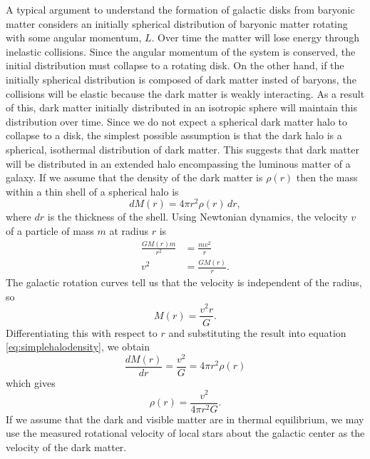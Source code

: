 A typical argument to understand the formation of galactic disks from baryonic
matter considers an initially spherical distribution of baryonic matter
rotating with some angular momentum, $L$. Over time the matter will lose
energy through inelastic collisions. Since the angular momentum of the system
is conserved, the initial distribution must collapse to a rotating disk.  On
the other hand, if the initially spherical distribution is composed of dark
matter insted of baryons, the collisions will be elastic because the dark
matter is weakly interacting. As a result of this, dark matter initially
distributed in an isotropic sphere will maintain this distribution over time.
Since we do not expect a spherical dark matter halo to collapse to a disk, the
simplest possible assumption is that the dark halo is a spherical, isothermal
distribution of dark matter. This suggests that dark matter will be
distributed in an extended halo encompassing the luminous matter of a galaxy.
If we assume that the density of the dark matter
is $\rho(r)$ then the mass within a thin shell of a spherical halo is
\begin{equation}
dM(r) = 4\pi r^2 \rho(r)\, dr,
\label{eq:simplehalodensity}
\end{equation}
where $dr$ is the thickness of the shell.
Using Newtonian dynamics, the velocity $v$ of a particle of mass $m$ at
radius $r$ is
\begin{equation}
\begin{split}
\frac{GM(r)m}{r^2} &= \frac{mv^2}{r} \\
v^2 &= \frac{GM(r)}{r}.
\end{split}
\end{equation}
The galactic rotation curves tell us that the velocity is independent of the
radius, so
\begin{equation}
M(r) = \frac{v^2r}{G}.
\end{equation}
Differentiating this with respect to $r$ and substituting the result into
equation \ref{eq:simplehalodensity}, we obtain
\begin{equation}
\frac{dM(r)}{dr} = \frac{v^2}{G} = 4\pi r^2\rho(r)
\end{equation}
which gives
\begin{equation}
\rho(r) = \frac{v^2}{4\pi r^2 G}.
\label{eq:simplehalodensity2}
\end{equation}
If we assume that the dark and visible matter are in thermal equilibrium, we
may use the measured rotational velocity of local stars about the galactic
center as the velocity of the dark matter. 

